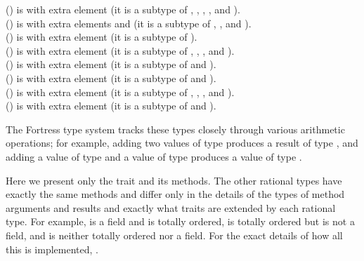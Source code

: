 \begin{tabbing}
 () is  with extra element \EXP{+\infty}
(it is a subtype of , , , , and ).
\\
 () is
 with extra elements \EXP{+\infty} and \EXP{-\infty}
(it is a subtype of , , and ).
\\
 () is  with extra element 
(it is a subtype of ).
\\
 () is  with extra element 
(it is a subtype of , , , and ).
\\
 () is  with extra element 
(it is a subtype of  and ).
\\
 () is  with extra element 
(it is a subtype of  and ).
\\
 () is  with extra element 
(it is a subtype of , ,
, and ).
\\
 () is  with extra element 
(it is a subtype of  and ).
\end{tabbing}

The Fortress type system tracks these types closely through various arithmetic
operations; for example, adding two values of type  produces a result of type ,
and adding a value of type  and a value of type  produces a value
of type .

Here we present only the trait  and its methods.
The other rational types have exactly the same methods and differ
only in the details of the types of method arguments and results
and exactly what traits are extended by each rational type.
For example,  is a field and is totally ordered,
 is totally ordered but is not a field,
and  is neither totally ordered nor a field.
For the exact details of how all this is implemented, .

